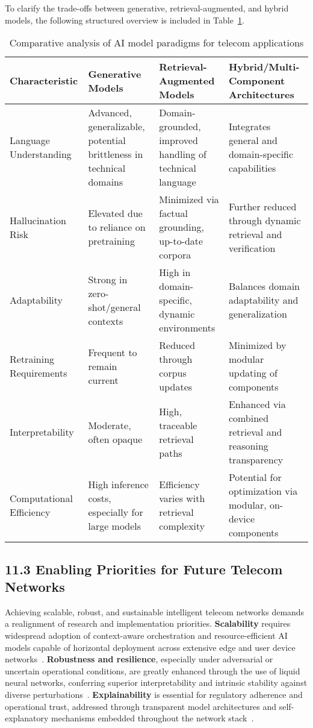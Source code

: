 \documentclass[11pt]{article}
\begin{document}
To clarify the trade-offs between generative, retrieval-augmented, and hybrid models, the following structured overview is included in Table~\ref{tab:model_comparison}.

\begin{table}[ht]
    \centering
    \caption{Comparative analysis of AI model paradigms for telecom applications}
    \label{tab:model_comparison}
    \begin{tabular}{|l|p{3.2cm}|p{3.2cm}|p{3.5cm}|}
    \hline
    \textbf{Characteristic} & \textbf{Generative Models} & \textbf{Retrieval-Augmented Models} & \textbf{Hybrid/Multi-Component Architectures} \\
    \hline
    Language Understanding & Advanced, generalizable, potential brittleness in technical domains & Domain-grounded, improved handling of technical language & Integrates general and domain-specific capabilities \\
    \hline
    Hallucination Risk & Elevated due to reliance on pretraining & Minimized via factual grounding, up-to-date corpora & Further reduced through dynamic retrieval and verification \\
    \hline
    Adaptability & Strong in zero-shot/general contexts & High in domain-specific, dynamic environments & Balances domain adaptability and generalization \\
    \hline
    Retraining Requirements & Frequent to remain current & Reduced through corpus updates & Minimized by modular updating of components \\
    \hline
    Interpretability & Moderate, often opaque & High, traceable retrieval paths & Enhanced via combined retrieval and reasoning transparency \\
    \hline
    Computational Efficiency & High inference costs, especially for large models & Efficiency varies with retrieval complexity & Potential for optimization via modular, on-device components \\
    \hline
    \end{tabular}
\end{table}

\subsection{11.3 Enabling Priorities for Future Telecom Networks}

Achieving scalable, robust, and sustainable intelligent telecom networks demands a realignment of research and implementation priorities. \textbf{Scalability} requires widespread adoption of context-aware orchestration and resource-efficient AI models capable of horizontal deployment across extensive edge and user device networks~\cite{ref15,ref17,ref19}. \textbf{Robustness and resilience}, especially under adversarial or uncertain operational conditions, are greatly enhanced through the use of liquid neural networks, conferring superior interpretability and intrinsic stability against diverse perturbations~\cite{ref19}. \textbf{Explainability} is essential for regulatory adherence and operational trust, addressed through transparent model architectures and self-explanatory mechanisms embedded throughout the network stack~\cite{ref19,ref21,ref22,ref23}.
\end{document}
